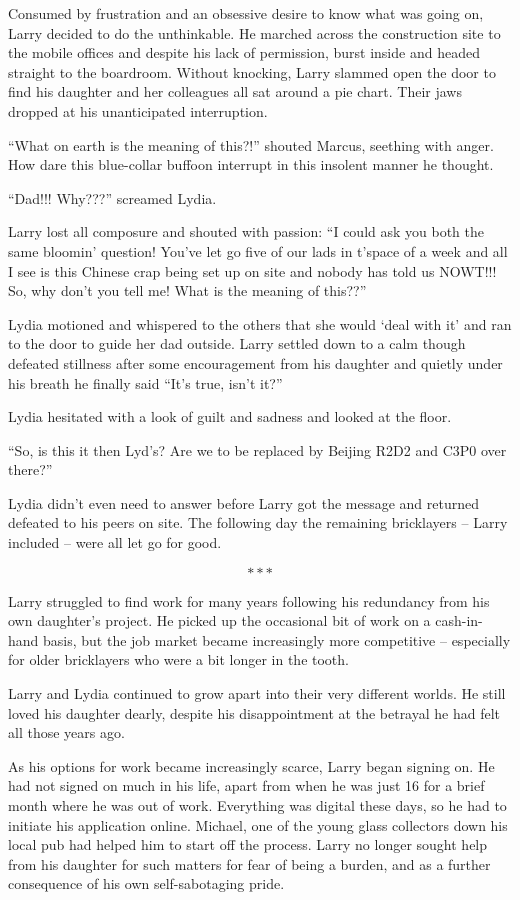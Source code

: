 Consumed by frustration and an obsessive desire to know what was going
on, Larry decided to do the unthinkable.  He marched across the
construction site to the mobile offices and despite his lack of
permission, burst inside and headed straight to the boardroom. Without
knocking, Larry slammed open the door to find his daughter and her
colleagues all sat around a pie chart. Their jaws dropped at his
unanticipated interruption.

“What on earth is the meaning of this?!” shouted Marcus, seething with
anger. How dare this blue-collar buffoon interrupt in this insolent
manner he thought.

“Dad!!! Why???” screamed Lydia.

Larry lost all composure and shouted with passion: “I could ask you
both the same bloomin’ question! You’ve let go five of our lads in
t’space of a week and all I see is this Chinese crap being set up on
site and nobody has told us NOWT!!! So, why don’t you tell me! What is
the meaning of this??”

Lydia motioned and whispered to the others that she would ‘deal with
it’ and ran to the door to guide her dad outside. Larry settled down
to a calm though defeated stillness after some encouragement from his
daughter and quietly under his breath he finally said “It’s true,
isn’t it?”

Lydia hesitated with a look of guilt and sadness and looked at the
floor.

“So, is this it then Lyd’s? Are we to be replaced by Beijing R2D2 and
C3P0 over there?”

Lydia didn’t even need to answer before Larry got the message and
returned defeated to his peers on site. The following day the
remaining bricklayers – Larry included – were all let go for good.

\[***\]

Larry struggled to find work for many years following his redundancy
from his own daughter’s project. He picked up the occasional bit of
work on a cash-in-hand basis, but the job market became increasingly
more competitive – especially for older bricklayers who were a bit
longer in the tooth.

Larry and Lydia continued to grow apart into their very different
worlds. He still loved his daughter dearly, despite his disappointment
at the betrayal he had felt all those years ago.

As his options for work became increasingly scarce, Larry began
signing on. He had not signed on much in his life, apart from when he
was just 16 for a brief month where he was out of work. Everything was
digital these days, so he had to initiate his application
online. Michael, one of the young glass collectors down his local pub
had helped him to start off the process. Larry no longer sought help
from his daughter for such matters for fear of being a burden, and as
a further consequence of his own self-sabotaging pride.


